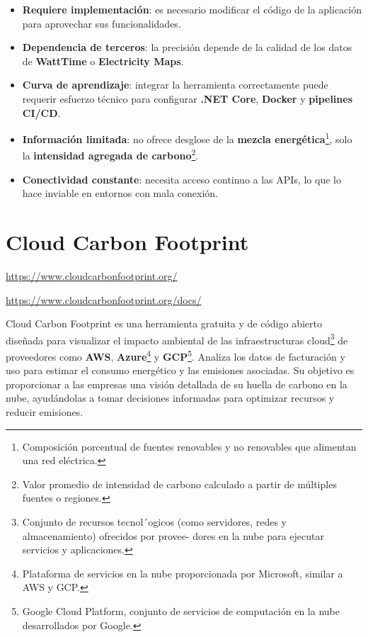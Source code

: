 \documentclass[12pt,a4paper]{report}
\begin{document}
\begin{itemize}
  \item \textbf{Requiere implementación}: es necesario modificar el código de la aplicación para aprovechar sus funcionalidades.
  \item \textbf{Dependencia de terceros}: la precisión depende de la calidad de los datos de \textbf{WattTime} o \textbf{Electricity Maps}.
  \item \textbf{Curva de aprendizaje}: integrar la herramienta correctamente puede requerir esfuerzo técnico para configurar \textbf{.NET Core}, \textbf{Docker} y \textbf{pipelines CI/CD}.
  \item \textbf{Información limitada}: no ofrece desglose de la \textbf{mezcla energética}\footnote{Composición porcentual de fuentes renovables y no renovables que alimentan una red eléctrica.}, solo la \textbf{intensidad agregada de carbono}\footnote{Valor promedio de intensidad de carbono calculado a partir de múltiples fuentes o regiones.}.
  \item \textbf{Conectividad constante}: necesita acceso continuo a las APIs, lo que lo hace inviable en entornos con mala conexión.
\end{itemize}

\section*{Cloud Carbon Footprint}

\href{https://www.cloudcarbonfootprint.org/}{https://www.cloudcarbonfootprint.org/}

\href{https://www.cloudcarbonfootprint.org/docs/}{https://www.cloudcarbonfootprint.org/docs/}

Cloud Carbon Footprint es una herramienta gratuita y de código abierto diseñada
para visualizar el impacto ambiental de las infraestructuras cloud\footnote{Conjunto de recursos tecnol´ogicos (como servidores, redes y almacenamiento) ofrecidos por provee-
dores en la nube para ejecutar servicios y aplicaciones.} de
proveedores como \textbf{AWS}, \textbf{Azure}\footnote{Plataforma de
  servicios en la nube proporcionada por Microsoft, similar a AWS y GCP.} y
\textbf{GCP}\footnote{Google Cloud Platform, conjunto de servicios de
  computación en la nube desarrollados por Google.}. Analiza los datos de
facturación y uso para estimar el consumo energético y las emisiones asociadas.
Su objetivo es proporcionar a las empresas una visión detallada de su huella de
carbono en la nube, ayudándolas a tomar decisiones informadas para optimizar
recursos y reducir emisiones.
\end{document}
